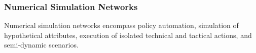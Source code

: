 




\subsubsection{Numerical Simulation Networks}
Numerical simulation networks encompass policy automation, simulation of hypothetical attributes, execution of isolated technical and tactical actions, and semi-dynamic scenarios. 

